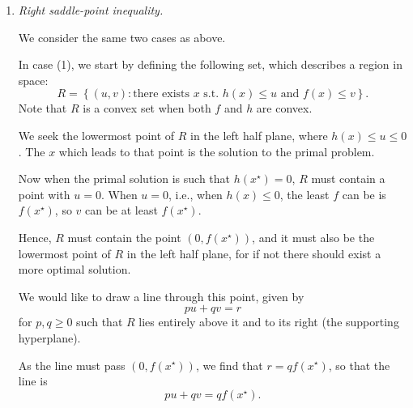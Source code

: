 \documentclass{article}[a4paper]
\begin{document}
\begin{enumerate}[label=(\alph*), ref=2.\alph*]
\begin{enumerate}[label=(\arabic*), ref=\theenumi.\arabic*]
            The optimal $\mu$ therefore must be $0$; \[
                \mu^\star
                =
                \underset{\mu \geq 0}{\arg \max} \, d\left( \mu \right)
                =
                0.
            \] Hence, \[
                \mathcal{L}\left( \mu^\star, x^\star \right)
                =
                f\left( x^\star \right) + 0 \cdot h\left( x^\star \right)
                =
                f\left( x^\star \right).
            \]

            We have established the required equality in both cases.

            \item \textit{Right saddle-point inequality.}
            
            \label{q2b2} We consider the same two cases as above.
            
            In case (1), we start by defining the following set, which describes a region in space: \[
            R = \left\{
                \left( u, v \right)
                :
                \text{there exists } x \text{ s.t. } h\left( x \right) \leq u \text{ and } f\left( x \right) \leq v
            \right\}.
            \] Note that $R$ is a convex set when both $f$ and $h$ are convex.
            
            We seek the lowermost point of $R$ in the left half plane, where $h\left( x \right) \leq u \leq 0$. The $x$ which leads to that point is the solution to the primal problem.
            
            Now when the primal solution is such that $h\left( x^\star \right) = 0$, $R$ must contain a point with $u = 0$. When $u = 0$, i.e., when $h(x) \leq 0$, the least $f$ can be is $f\left( x^\star \right)$, so $v$ can be at least $f\left( x^\star \right)$.
            
            Hence, $R$ must contain the point $\left( 0, f\left( x^\star \right) \right)$, and it must also be the lowermost point of $R$ in the left half plane, for if not there should exist a more optimal solution. %

            We would like to draw a line through this point, given by \[
                pu + qv = r
            \] for $p, q \geq 0$ such that $R$ lies entirely above it and to its right (the supporting hyperplane).

            As the line must pass $\left( 0, f\left( x^\star \right) \right)$, we find that $r = q f\left( x^\star \right)$, so that the line is \[
                pu + qv = q f\left( x^\star \right).
            \]


\end{enumerate}
\end{enumerate}
\end{document}
